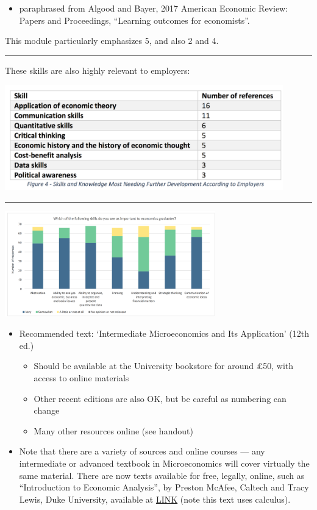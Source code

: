 \documentclass[]{article}
\providecommand{\tightlist}{%
  \setlength{\itemsep}{0pt}\setlength{\parskip}{0pt}}
\begin{document}
\begin{itemize}
\tightlist
\item
  paraphrased from Algood and Bayer, 2017 American Economic Review: Papers and Proceedings, ``Learning outcomes for economists''.
\end{itemize}

This module particularly emphasizes 5, and also 2 and 4.

\begin{center}\rule{0.5\linewidth}{\linethickness}\end{center}

These skills are also highly relevant to employers:

\includegraphics[height=1.8in]{picsfigs/skillschart.png}

\begin{center}\rule{0.5\linewidth}{\linethickness}\end{center}

\includegraphics[height=1.8in]{picsfigs/skillsbar.png}

\begin{itemize}
\tightlist
\item
  Recommended text: `Intermediate Microeconomics and Its Application' (12th ed.)

  \begin{itemize}
  \tightlist
  \item
    Should be available at the University bookstore for around \pounds50, with access to online materials
  \item
    Other recent editions are also OK, but be careful as numbering can change
  \item
    Many other resources online (see handout)
  \end{itemize}
\item
  Note that there are a variety of sources and online courses --- any intermediate or advanced textbook in Microeconomics will cover virtually the same material. There are now texts available for free, legally, online, such as ``Introduction to Economic Analysis'', by Preston McAfee, Caltech and Tracy Lewis, Duke University, available at \href{https://open.umn.edu/opentextbooks/BookDetail.aspx?bookId=47}{LINK} (note this text uses calculus).
\end{itemize}
\end{document}
